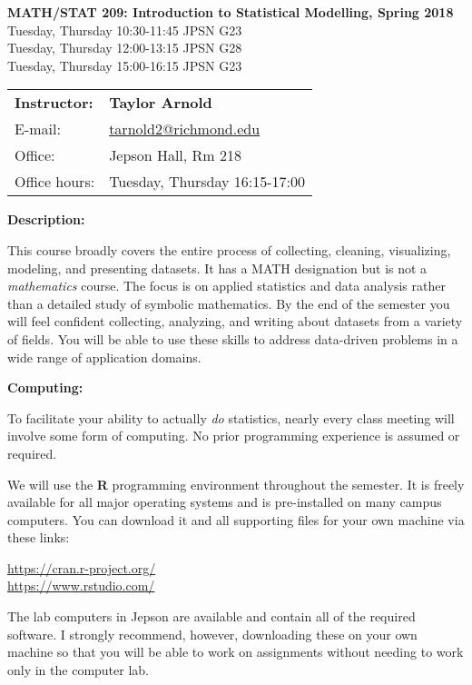 \documentclass[12pt]{article}
\begin{document}
\begin{center}
{\bf MATH/STAT 209: Introduction to Statistical Modelling, Spring 2018} \\
Tuesday, Thursday 10:30-11:45 \quad JPSN G23\\
Tuesday, Thursday 12:00-13:15 \quad JPSN G28\\
Tuesday, Thursday 15:00-16:15 \quad JPSN G23
\end{center}

\bigskip

\noindent
\begin{tabular}{ l l }
{\bf Instructor:} &  {\bf Taylor Arnold} \\
E-mail: & \href{mailto:tarnold2@richmond.edu}{tarnold2@richmond.edu} \\
Office: & Jepson Hall, Rm 218 \\
Office hours: & Tuesday, Thursday 16:15-17:00
\end{tabular}

\vspace{0.5cm}

\textbf{Description:} \vspace{6pt}

This course broadly covers the entire process of collecting,
cleaning, visualizing, modeling, and presenting datasets. It
has a MATH designation but is not a \textit{mathematics} course.
The focus is on applied statistics and data analysis
rather than a detailed study of symbolic mathematics. By the end
of the semester you will feel confident collecting, analyzing,
and writing about datasets from a variety of fields. You will be
able to use these skills to address data-driven problems in a wide
range of application domains.

\bigskip

\textbf{Computing:} \vspace{6pt}

To facilitate your ability to actually \textit{do} statistics,
nearly every class meeting will involve some form of computing.
No prior programming experience is assumed or required.

\medskip

We will use the \textbf{R} programming environment throughout the
semester. It is freely available for all major operating systems and
is pre-installed on many campus computers. You can download it and
all supporting files for your own machine via these links:
\begin{center}
\url{https://cran.r-project.org/} \\
\url{https://www.rstudio.com/}
\end{center}
The lab computers in Jepson are available and contain all of the
required software. I strongly recommend, however, downloading these
on your own machine so that you will be able to work on assignments
without needing to work only in the computer lab.
\end{document}
